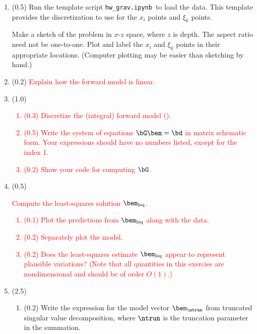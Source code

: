 \documentclass[11pt,titlepage,fleqn]{article}
\newcommand{\tfile}{{\tt hw\_grav.ipynb}}
\newcommand{\mv}{\xi}  %
\newcommand{\dv}{x}  %
\begin{document}

\begin{enumerate}
\item (0.5) Run the template script \tfile\ to load the data. This template provides the discretization to use for the $\dv_i$ points and $\mv_k$ points.

Make a sketch of the problem in $x$-$z$ space, where $z$ is depth. The aspect ratio need not be one-to-one. Plot and label the $\dv_i$ and $\mv_k$ points in their appropriate locations. (Computer plotting may be easier than sketching by hand.)


\item (0.2) \textcolor{red}{Explain how the forward model is linear.}
\label{prob1}


\item (1.0)
\textcolor{red}{
\begin{enumerate}
\item (0.3) Discretize the (integral) forward model ().
\item (0.5) Write the system of equations $\bG\bem = \bd$ in matrix schematic form. Your expressions should have no numbers listed, except for the index 1.
\item (0.2) Show your code for computing $\bG$.
\end{enumerate}
}


\item (0.5) 
\textcolor{red}{
Compute the least-squares solution $\bem_{\rm lsq}$.
\begin{enumerate}
\item (0.1) Plot the predictions from $\bem_{\rm lsq}$ along with the data.
\item (0.2) Separately plot the model.
\item (0.2) Does the least-squares estimate $\bem_{\rm lsq}$ appear to represent plausible variations? (Note that all quantities in this exercise are nondimensional and should be of order $O(1)$.)
\end{enumerate}
}


\item (2.5)

\begin{enumerate}
\item (0.2) Write the expression for the model vector $\bem_{\ntrun}$ from truncated singular value decomposition, where $\ntrun$ is the truncation parameter in the summation.


\end{enumerate}
\end{enumerate}
\end{document}

